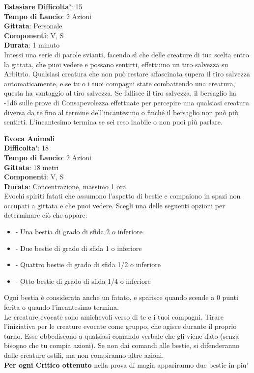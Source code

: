 \begin{multicols}{2}
\medskip\textbf{Estasiare}
\textbf{Difficolta'}: 15\\
\textbf{Tempo di Lancio}: 2 Azioni\\
\textbf{Gittata}: Personale\\
\textbf{Componenti}: V, S\\
\textbf{Durata}: 1 minuto\\
Intessi una serie di parole svianti, facendo sì che delle creature di tua scelta entro la gittata, che puoi vedere e possano sentirti, effettuino un tiro salvezza su Arbitrio. Qualsiasi creatura che non può restare affascinata supera il tiro salvezza automaticamente, e se tu o i tuoi compagni state combattendo una creatura, questa ha vantaggio al tiro salvezza. Se fallisce il tiro salvezza, il bersaglio ha -1d6 sulle prove di Consapevolezza effettuate per percepire una qualsiasi creatura diversa da te fino al termine dell’incantesimo o finché il bersaglio non può più sentirti.
L’incantesimo termina se sei reso inabile o non puoi più parlare.

\medskip\textbf{Evoca Animali}\\
\textbf{Difficolta'}: 18\\
\textbf{Tempo di Lancio}: 2 Azioni\\
\textbf{Gittata}: 18 metri\\
\textbf{Componenti}: V, S\\
\textbf{Durata}: Concentrazione, massimo 1 ora\\
Evochi spiriti fatati che assumono l’aspetto di bestie e compaiono in spazi non occupati a gittata e che puoi vedere. Scegli una delle seguenti opzioni per determinare ciò che appare:
\begin{itemize}
\item
- Una bestia di grado di sfida 2 o inferiore
\item
- Due bestie di grado di sfida 1 o inferiore
\item
- Quattro bestie di grado di sfida 1/2 o inferiore
\item
- Otto bestie di grado di sfida 1/4 o inferiore
\end{itemize}
\medskip
Ogni bestia è considerata anche un fatato, e sparisce quando scende a 0 punti ferita o quando l’incantesimo termina. \\
Le creature evocate sono amichevoli verso di te e i tuoi compagni. Tirare l’iniziativa per le creature evocate come gruppo, che agisce durante il proprio turno. Esse obbediscono a qualsiasi comando verbale che gli viene dato (senza bisogno che tu compia azioni). Se non dai comandi alle bestie, si difenderanno dalle creature ostili, ma non compiranno altre azioni.\\
\textbf{Per ogni Critico ottenuto} nella prova di magia appariranno due bestie in piu'


\end{multicols}
